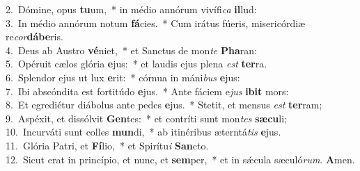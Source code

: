 {2.~}Dómine, opus \textbf{tu}um,~* in médio annórum vivífi\textit{ca} \textbf{il}lud:\\
{3.~}In médio annórum notum \textbf{fá}cies.~* Cum irátus fúeris, misericórdiæ re\textit{cor}\textbf{dá}\textbf{be}ris.\\
{4.~}Deus ab Austro \textbf{vé}niet,~* et Sanctus de mon\textit{te} \textbf{Pha}ran:\\
{5.~}Opéruit cælos glória \textbf{e}jus:~* et laudis ejus plena \textit{est} \textbf{ter}ra.\\
{6.~}Splendor ejus ut lux \textbf{e}rit:~* córnua in máni\textit{bus} \textbf{e}jus:\\
{7.~}Ibi abscóndita est fortitúdo \textbf{e}jus.~* Ante fáciem e\textit{jus} \textbf{i}\textbf{bit} mors:\\
{8.~}Et egrediétur diábolus ante pedes \textbf{e}jus.~* Stetit, et mensus \textit{est} \textbf{ter}ram;\\
{9.~}Aspéxit, et dissólvit \textbf{Gen}tes:~* et contríti sunt mon\textit{tes} \textbf{sæ}\textbf{cu}li;\\
{10.~}Incurváti sunt colles \textbf{mun}di,~* ab itinéribus æterntá\textit{tis} \textbf{e}jus.\\
{11.~}Glória Patri, et \textbf{Fí}lio,~* et Spirítu\textit{i} \textbf{San}cto.\\
{12.~}Sicut erat in princípio, et nunc, et \textbf{sem}per,~* et in sǽcula sæculó\textit{rum}. \textbf{A}men.\\
